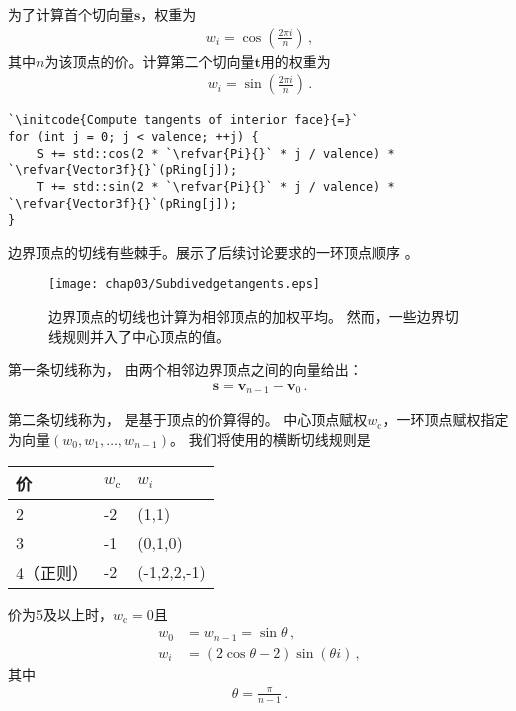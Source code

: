 为了计算首个切向量$\bm s$，权重为
\begin{align*}
    w_i=\cos{\left(\frac{2\pi i}{n}\right)}\, ,
\end{align*}
其中$n$为该顶点的价。计算第二个切向量$\bm t$用的权重为
\begin{align*}
    w_i=\sin{\left(\frac{2\pi i}{n}\right)}\, .
\end{align*}

\begin{lstlisting}
`\initcode{Compute tangents of interior face}{=}`
for (int j = 0; j < valence; ++j) {
    S += std::cos(2 * `\refvar{Pi}{}` * j / valence) * `\refvar{Vector3f}{}`(pRing[j]);
    T += std::sin(2 * `\refvar{Pi}{}` * j / valence) * `\refvar{Vector3f}{}`(pRing[j]);
}
\end{lstlisting}

边界顶点的切线有些棘手。展示了后续讨论要求的一环顶点顺序
。
\begin{figure}[htbp]
    \centering\texttt{[image: chap03/Subdivedgetangents.eps]}
    \caption{边界顶点的切线也计算为相邻顶点的加权平均。
        然而，一些边界切线规则并入了中心顶点的值。}
    \label{fig:3.38}
\end{figure}

第一条切线称为，
由两个相邻边界顶点之间的向量给出：
\begin{align*}
    \bm s=\bm v_{n-1}-\bm v_0\, .
\end{align*}

第二条切线称为，
是基于顶点的价算得的。
中心顶点赋权$w_{\mathrm{c}}$，一环顶点赋权指定为向量$(w_0,w_1,\ldots,w_{n-1})$。
我们将使用的横断切线规则是
\begin{table*}[h]
    \centering
    \begin{tabular}{lll}
        \toprule
        价        & $w_{\mathrm{c}}$ & $w_i$       \\
        \midrule
        2         & -2               & (1,1)       \\
        3         & -1               & (0,1,0)     \\
        4（正则） & -2               & (-1,2,2,-1) \\
        \bottomrule
    \end{tabular}
\end{table*}

价为5及以上时，$w_{\mathrm{c}}=0$且
\begin{align*}
    w_0 & =w_{n-1}=\sin{\theta}\, ,              \\
    w_i & =(2\cos{\theta}-2)\sin{(\theta i)}\, ,
\end{align*}
其中
\begin{align*}
    \theta=\frac{\pi}{n-1}\, .
\end{align*}


